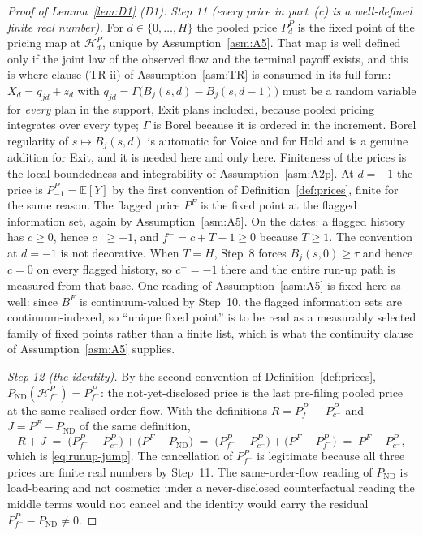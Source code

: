 \documentclass[11pt]{article}
\newcommand{\Eop}{\mathbb{E}}
\newcommand{\ND}{\mathrm{ND}}
\begin{document}
\begin{proof}[Proof of Lemma~\ref{lem:D1} (D1)]
\emph{Step 11 (every price in part~(c) is a well-defined finite real number).} For
$d \in \{0,\dots,H\}$ the pooled price $P_d^P$ is the fixed point of the pricing map at
$\mathcal H_d^P$, unique by Assumption~\ref{asm:A5}. That map is well defined only if the joint law
of the observed flow and the terminal payoff exists, and this is where clause (TR-ii) of
Assumption~\ref{asm:TR} is consumed in its full form: $X_d = q_{jd} + z_d$ with
$q_{jd} = \Gamma\bigl(B_j(s,d)-B_j(s,d-1)\bigr)$ must be a random variable for \emph{every} plan in
the support, Exit plans included, because pooled pricing integrates over every type; $\Gamma$ is
Borel because it is ordered in the increment. Borel regularity of $s \mapsto B_j(s,d)$ is automatic
for Voice and for Hold and is a genuine addition for Exit, and it is needed here and only here.
Finiteness of the prices is the local boundedness and integrability of Assumption~\ref{asm:A2p}. At
$d = -1$ the price is $P_{-1}^P = \Eop[Y]$ by the first convention of
Definition~\ref{def:prices}, finite for the same reason. The flagged price $P^F$ is the fixed point
at the flagged information set, again by Assumption~\ref{asm:A5}. On the dates: a flagged history has
$c \ge 0$, hence $c^- \ge -1$, and $f^- = c+T-1 \ge 0$ because $T \ge 1$. The convention at $d=-1$ is
not decorative. When $T = H$, Step~8 forces $B_j(s,0) \ge \tau$ and hence $c = 0$ on every flagged
history, so $c^- = -1$ there and the entire run-up path is measured from that base. One reading of
Assumption~\ref{asm:A5} is fixed here as well: since $B^F$ is continuum-valued by Step~10, the
flagged information sets are continuum-indexed, so ``unique fixed point'' is to be read as a
measurably selected family of fixed points rather than a finite list, which is what the continuity
clause of Assumption~\ref{asm:A5} supplies.

\emph{Step 12 (the identity).} By the second convention of Definition~\ref{def:prices},
$P_{\ND}(\mathcal H_{f^-}^P) = P_{f^-}^P$: the not-yet-disclosed price is the last pre-filing pooled
price at the same realised order flow. With the definitions $R = P_{f^-}^P - P_{c^-}^P$ and
$J = P^F - P_{\ND}$ of the same definition,
\begin{equation}
\label{eq:D1-telescope}
R + J \;=\; \bigl(P_{f^-}^P - P_{c^-}^P\bigr) + \bigl(P^F - P_{\ND}\bigr)
       \;=\; \bigl(P_{f^-}^P - P_{c^-}^P\bigr) + \bigl(P^F - P_{f^-}^P\bigr)
       \;=\; P^F - P_{c^-}^P ,
\end{equation}
which is \eqref{eq:runup-jump}. The cancellation of $P_{f^-}^P$ is legitimate because all three
prices are finite real numbers by Step~11. The same-order-flow reading of $P_{\ND}$ is load-bearing
and not cosmetic: under a never-disclosed counterfactual reading the middle terms would not cancel
and the identity would carry the residual $P_{f^-}^P - P_{\ND} \ne 0$.


\end{proof}
\end{document}
